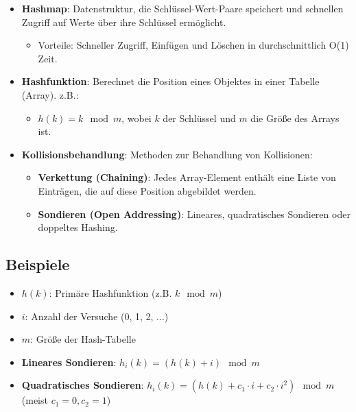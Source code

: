 \documentclass[8pt, landscape]{article}
\newcommand{\formel}[1]{\ensuremath{#1}}
\newcommand{\algo}[1]{\textbf{\textcolor{blue!60!black}{#1}}}
\newcommand{\datastruct}[1]{\textbf{\textcolor{red!60!black}{#1}}}
\begin{document}
\begin{multicols*}{4}
\begin{itemize}
    \item \datastruct{Hashmap}: Datenstruktur, die Schlüssel-Wert-Paare speichert und schnellen Zugriff auf Werte über ihre Schlüssel ermöglicht.
    \begin{itemize}
        \item Vorteile: Schneller Zugriff, Einfügen und Löschen in durchschnittlich O(1) Zeit.
    \end{itemize}
    \item \datastruct{Hashfunktion}: Berechnet die Position eines Objektes in einer Tabelle (Array). z.B.:
    \begin{itemize}
        \item \formel{h(k) = k \mod m}, wobei \formel{k} der Schlüssel und \formel{m} die Größe des Arrays ist.
    \end{itemize}
    \item \datastruct{Kollisionsbehandlung}: Methoden zur Behandlung von Kollisionen:
    \begin{itemize}
        \item \algo{Verkettung (Chaining)}: Jedes Array-Element enthält eine Liste von Einträgen, die auf diese Position abgebildet werden.
        \item \algo{Sondieren (Open Addressing)}: Lineares, quadratisches Sondieren oder doppeltes Hashing.
\end{itemize}
\end{itemize}



\subsection*{Beispiele}

\begin{itemize}
    \item \formel{h(k)}: Primäre Hashfunktion (z.B. \formel{k \mod m})
    \item \formel{i}: Anzahl der Versuche (0, 1, 2, ...)
    \item \formel{m}: Größe der Hash-Tabelle
\end{itemize}

\noindent\hrulefill

\begin{itemize} 
\item \datastruct{Lineares Sondieren}: \formel{h_i(k) = (h(k) + i) \mod m}
\item \datastruct{Quadratisches Sondieren}:  \formel{h_i(k) = (h(k) + c_1 \cdot i + c_2 \cdot i^2) \mod m} (meist $c_1 = 0, c_2 = 1$)


\end{itemize}
\end{multicols*}
\end{document}
